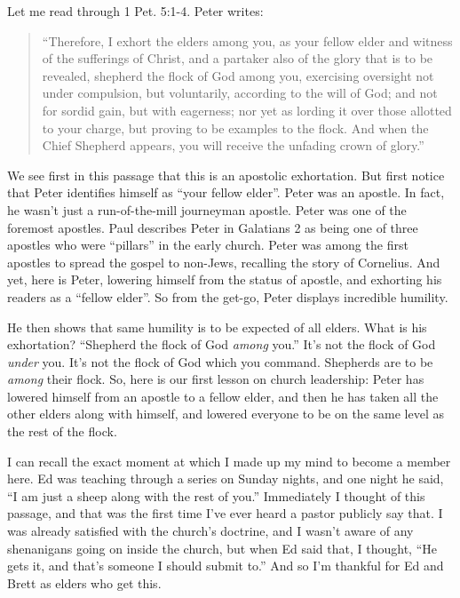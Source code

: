 \documentclass[letterpaper, 12pt]{article}
\begin{document}
    Let me read through 1 Pet. 5:1-4. Peter writes:

    \begin{quote}

        ``Therefore, I exhort the elders among you, as your fellow elder
        and witness of the sufferings of Christ, and a partaker also of
        the glory that is to be revealed, shepherd the flock of God
        among you, exercising oversight not under compulsion, but
        voluntarily, according to the will of God; and not for sordid
        gain, but with eagerness; nor yet as lording it over those
        allotted to your charge, but proving to be examples to the
        flock.  And when the Chief Shepherd appears, you will receive
        the unfading crown of glory.''

    \end{quote}

    We see first in this passage that this is an apostolic exhortation.
    But first notice that Peter identifies himself as ``your fellow
    elder''. Peter was an apostle. In fact, he wasn't just a
    run-of-the-mill journeyman apostle. Peter was one of the foremost
    apostles. Paul describes Peter in Galatians 2 as being one of three
    apostles who were ``pillars'' in the early church. Peter was among
    the first apostles to spread the gospel to non-Jews, recalling the
    story of Cornelius.  And yet, here is Peter, lowering himself from
    the status of apostle, and exhorting his readers as a ``fellow
    elder''. So from the get-go, Peter displays incredible humility.

    He then shows that same humility is to be expected of all elders.
    What is his exhortation? ``Shepherd the flock of God \emph{among}
    you.'' It's not the flock of God \emph{under} you. It's not the
    flock of God which you command. Shepherds are to be \emph{among}
    their flock. So, here is our first lesson on church leadership:
    Peter has lowered himself from an apostle to a fellow elder, and
    then he has taken all the other elders along with himself, and
    lowered everyone to be on the same level as the rest of the flock.

    I can recall the exact moment at which I made up my mind to become a
    member here. Ed was teaching through a series on Sunday nights, and
    one night he said, ``I am just a sheep along with the rest of you.''
    Immediately I thought of this passage, and that was the
    first time I've ever heard a pastor publicly say that. I was already
    satisfied with the church's doctrine, and I wasn't aware of any
    shenanigans going on inside the church, but when Ed said that, I
    thought, ``He gets it, and that's someone I should submit to.'' And
    so I'm thankful for Ed and Brett as elders who get this.
\end{document}
